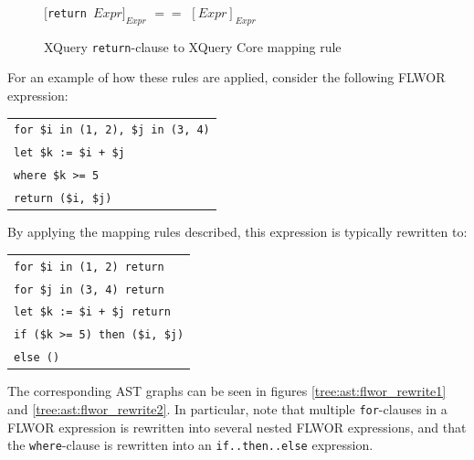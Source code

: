 \begin{figure}[!h]
\centering
$[$\texttt{return }$Expr]_{Expr}$ \newline
$==$ \newline
$[Expr]_{Expr}$
  \caption{XQuery \texttt{return}-clause to XQuery Core mapping rule}
  \label{figure:xquery:return_mapping_rule}
\end{figure}


For an example of how these rules are applied, consider the following FLWOR
expression:
%
\begin{center}
\begin{tabular}{l}
\texttt{for \$i in (1, 2), \$j in (3, 4)} \\
  \texttt{let \$k := \$i + \$j} \\
  \texttt{where \$k >= 5} \\
   \texttt{return (\$i, \$j)} \\
\end{tabular}
\end{center}

By applying the mapping rules described,  this expression is typically
rewritten to:
%
\begin{center}
\begin{tabular}{l}
\texttt{for \$i in (1, 2) return} \\ \quad
  \texttt{for \$j in (3, 4) return} \\ \quad
    \texttt{let \$k := \$i + \$j return} \\ \quad \quad
      \texttt{if (\$k >= 5) then (\$i, \$j)} \\ \quad \quad 
      \texttt{else ()} 
\end{tabular}
\end{center}
The corresponding AST graphs can be seen in figures
\ref{tree:ast:flwor_rewrite1} and \ref{tree:ast:flwor_rewrite2}. In particular,
note that multiple \texttt{for}-clauses in a FLWOR expression is rewritten into several
nested FLWOR expressions, and that the \texttt{where}-clause is  rewritten into an
\texttt{if..then..else} expression. 

